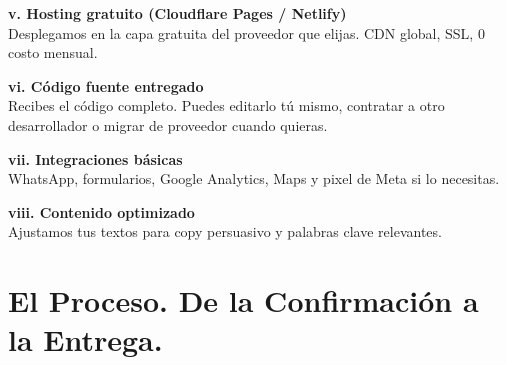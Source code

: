 \documentclass[11pt, a4paper]{article}
\begin{document}
  \begin{minipage}[t]{0.48\textwidth}
    \textbf{\color{darkslate}
    v. Hosting gratuito (Cloudflare Pages / Netlify)} \\[1mm]
    {\small\color{basicgray}Desplegamos en la capa gratuita del proveedor que elijas. CDN global, SSL, 0 costo mensual.}

    \vspace{3mm}

    \textbf{\color{darkslate}
    vi. Código fuente entregado} \\[1mm] {\small\color{basicgray}Recibes el código completo. Puedes editarlo tú mismo, contratar a otro desarrollador o migrar de proveedor cuando quieras.}

    \vspace{3mm}

    \textbf{\color{darkslate}
    vii. Integraciones básicas} \\[1mm]
    {\small\color{basicgray}WhatsApp, formularios, Google Analytics, Maps y pixel de Meta si lo necesitas.}

    \vspace{3mm}

    \textbf{\color{darkslate}
    viii. Contenido optimizado} \\[1mm] {\small\color{basicgray}Ajustamos tus textos para copy persuasivo y palabras clave relevantes.}
  \end{minipage}

  \vspace{8mm}

  \section*{El Proceso. De la Confirmación a la Entrega.}

  \vspace{2mm}
\end{document}

